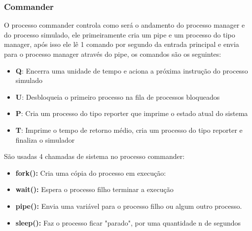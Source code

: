 \documentclass[a4paper, 12pt]{article}
\begin{document}
 \subsubsection{Commander}  O processo commander controla como será o andamento do processo manager e do processo simulado, ele primeiramente cria um pipe e um processo do tipo manager, após isso ele lê 1 comando por segundo da entrada principal e envia para o processo manager através do pipe, os comandos são os seguintes:
 \begin{itemize}
 \item \textbf{Q}: Encerra uma unidade de tempo e aciona a próxima instrução do processo simulado
 \item \textbf{U}: Desbloqueia o primeiro processo na fila de processos bloqueados
 \item \textbf{P}: Cria um processo do tipo reporter que imprime o estado atual do sistema
 \item \textbf{T}: Imprime o tempo de retorno médio, cria um processo do tipo reporter e finaliza o simulador
 \end{itemize}
 São usadas 4 chamadas de sistema no processo commander:
 \begin{itemize}
 \item \textbf{fork():} Cria uma cópia do processo em execução:

 \item \textbf{wait():} Espera o processo filho terminar a execução

 \item \textbf{pipe():} Envia uma variável para o processo filho ou algum outro processo.

 \item \textbf{sleep():} Faz o processo ficar "parado", por uma quantidade n de segundos
 \end{itemize}
\end{document}
